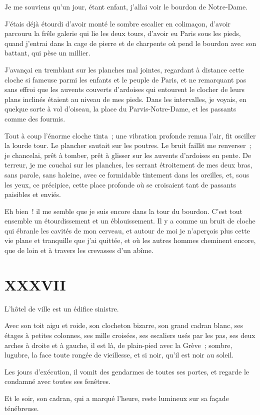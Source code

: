 \documentclass[french,twoside]{book} %
\begin{document}
\noindent Je me souviens qu’un jour, étant enfant, j’allai voir le bourdon de Notre-Dame.\par
J’étais déjà étourdi d’avoir monté le sombre escalier en colimaçon, d’avoir parcouru la frêle galerie qui lie les deux tours, d’avoir eu Paris sous les pieds, quand j’entrai dans la cage de pierre et de charpente où pend le bourdon avec son battant, qui pèse un millier.\par
J’avançai en tremblant sur les planches mal jointes, regardant à distance cette cloche si fameuse parmi les enfants et le peuple de Paris, et ne remarquant pas sans effroi que les auvents couverts d’ardoises qui entourent le clocher de leurs plans inclinés étaient au niveau de mes pieds. Dans les intervalles, je voyais, en quelque sorte à vol d’oiseau, la place du Parvis-Notre-Dame, et les passants comme des fourmis.\par
Tout à coup l’énorme cloche tinta ; une vibration profonde remua l’air, fit osciller la lourde tour. Le plancher sautait sur les poutres. Le bruit faillit me renverser ; je chancelai, prêt à tomber, prêt à glisser  sur les auvents d’ardoises en pente. De terreur, je me couchai sur les planches, les serrant étroitement de mes deux bras, sans parole, sans haleine, avec ce formidable tintement dans les oreilles, et, sous les yeux, ce précipice, cette place profonde où se croisaient tant de passants paisibles et enviés.\par
Eh bien ! il me semble que je suis encore dans la tour du bourdon. C’est tout ensemble un étourdissement et un éblouissement. Il y a comme un bruit de cloche qui ébranle les cavités de mon cerveau, et autour de moi je n’aperçois plus cette vie plane et tranquille que j’ai quittée, et où les autres hommes cheminent encore, que de loin et à travers les crevasses d’un abîme.
 \section[{XXXVII}]{XXXVII}
\label{ch37}\renewcommand{\leftmark}{XXXVII}

\noindent L’hôtel de ville est un édifice sinistre.\par
Avec son toit aigu et roide, son clocheton bizarre, son grand cadran blanc, ses étages à petites colonnes, ses mille croisées, ses escaliers usés par les pas, ses deux arches à droite et à gauche, il est là, de plain-pied avec la Grève ; sombre, lugubre, la face toute rongée de vieillesse, et si noir, qu’il est noir au soleil.\par
Les jours d’exécution, il vomit des gendarmes de toutes ses portes, et regarde le condamné avec toutes ses fenêtres.\par
Et le soir, son cadran, qui a marqué l’heure, reste lumineux sur sa façade ténébreuse.
\end{document}
